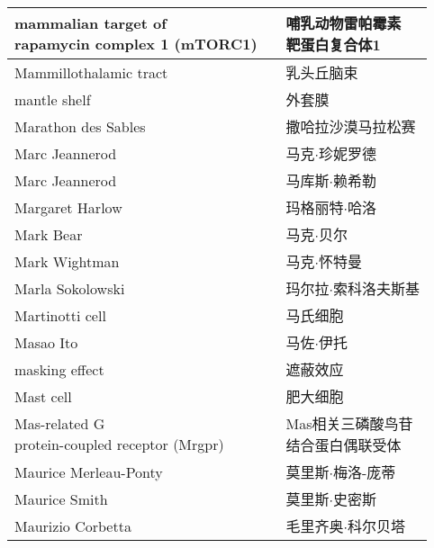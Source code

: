 \begin{longtable}{lll}
	\midrule
	\makecell[l]{mammalian target of \\rapamycin complex 1 (mTORC1)}   && \makecell[l]{哺乳动物雷帕霉素\\靶蛋白复合体1}  \\
	
	\midrule
	Mammillothalamic tract   && 乳头丘脑束  \\
	
	\midrule
	mantle shelf   && 外套膜  \\
	
	\midrule
	Marathon des Sables   && 撒哈拉沙漠马拉松赛  \\
	
	\midrule
	Marc Jeannerod   && 马克$\cdot$珍妮罗德  \\
	
	\midrule
	Marc Jeannerod   && 马库斯$\cdot$赖希勒  \\
	
	\midrule
	Margaret Harlow   && 玛格丽特$\cdot$哈洛  \\
	
	\midrule
	Mark Bear   && 马克$\cdot$贝尔  \\
	
	\midrule
	Mark Wightman   && 马克$\cdot$怀特曼  \\
	
	\midrule
	Marla Sokolowski   && 玛尔拉$\cdot$索科洛夫斯基 \\
	
	\midrule
	Martinotti cell   && 马氏细胞 \\
	
	\midrule
	Masao Ito   && 马佐$\cdot$伊托 \\
	
	\midrule
	masking effect   && 遮蔽效应 \\
	
	\midrule
	Mast cell   && 肥大细胞 \\
	
	\midrule
	\makecell[l]{Mas-related G \\protein-coupled receptor (Mrgpr)}  && \makecell[l]{Mas相关三磷酸鸟苷\\结合蛋白偶联受体} \\
	
	\midrule
	Maurice Merleau-Ponty   && 莫里斯$\cdot$梅洛-庞蒂  \\
	
	\midrule
	Maurice Smith   && 莫里斯$\cdot$史密斯  \\
	
	\midrule
	Maurizio Corbetta   && 毛里齐奥$\cdot$科尔贝塔  \\
	

\end{longtable}
